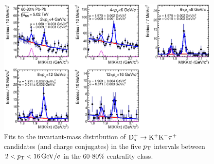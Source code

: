\begin{figure}[!ht]
 \begin{center}
  \includegraphics[width=.9\textwidth]{FigCap5/DsMassHistos_6080.eps}
\end{center}
 \caption{Fits to the invariant-mass distribution of ${\rm D^{+}_\mathrm{s}\to K^+ K^-\pi^+}$ candidates (and charge conjugates) in the five $p_{\rm T}$ intervals between $2 < p_{\rm T} < 16 \, \mathrm{GeV}/c$ in the 60-80\% centrality class. }
 \label{fig:FigInvMassDs_pbpb6080} 
\end{figure} 
 

